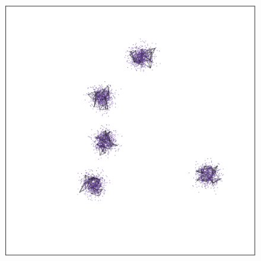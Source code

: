 \documentclass[
  12pt]{article}
\begin{document}
\begin{figure}[H]
\begin{minipage}[t]{0.33\linewidth}
{{\includegraphics{figures/five_gau_clusters/sc_tsne_2.png}

}

}

\subcaption{\label{fig-gau1_sc2}}
\end{minipage}%
%
\begin{minipage}[t]{0.33\linewidth}

{\centering 

}
\end{minipage}
\end{figure}
\end{document}
